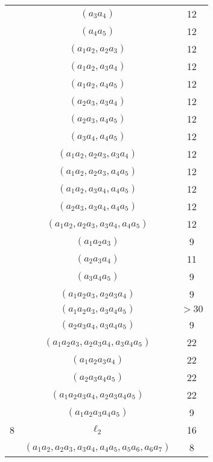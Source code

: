 \documentclass{article}
\begin{document}
\begin{flushleft}
\begin{multicols*}{2}
\begin{center}
\begin{tabular}{|c|c|c|}
            & $(a_3a_4)$ & 12 \\
            & $(a_4a_5)$ & 12 \\
            & $(a_1a_2, a_2a_3)$ & 12 \\
            & $(a_1a_2, a_3a_4)$ & 12 \\
            & $(a_1a_2, a_4a_5)$ & 12 \\
            & $(a_2a_3, a_3a_4)$ & 12 \\
            & $(a_2a_3, a_4a_5)$ & 12 \\
            & $(a_3a_4, a_4a_5)$ & 12 \\
            & $(a_1a_2, a_2a_3, a_3a_4)$ & 12 \\
            & $(a_1a_2, a_2a_3, a_4a_5)$ & 12 \\
            & $(a_1a_2, a_3a_4, a_4a_5)$ & 12 \\
            & $(a_2a_3, a_3a_4, a_4a_5)$ & 12 \\
            & $(a_1a_2, a_2a_3, a_3a_4, a_4a_5)$ & 12 \\
            \rowcolor{red!30!white}
            & $(a_1a_2a_3)$ & 9 \\
            \rowcolor{red!30!white}
            & $(a_2a_3a_4)$ & 11 \\
            \rowcolor{red!30!white}
            & $(a_3a_4a_5)$ & 9 \\
            \rowcolor{red!30!white}
            & $(a_1a_2a_3, a_2a_3a_4)$ & 9 \\
            \rowcolor{red!30!white}
            & $(a_1a_2a_3, a_3a_4a_5)$ & $>30$ \\
            \rowcolor{red!30!white}
            & $(a_2a_3a_4, a_3a_4a_5)$ & 9 \\
            \rowcolor{red!30!white}
            & $(a_1a_2a_3, a_2a_3a_4, a_3a_4a_5)$ & 22 \\
            \rowcolor{red!30!white}
            & $(a_1a_2a_3a_4)$ & 22 \\
            \rowcolor{red!30!white}
            & $(a_2a_3a_4a_5)$ & 22 \\
            \rowcolor{red!30!white}
            & $(a_1a_2a_3a_4, a_2a_3a_4a_5)$ & 22 \\
            \rowcolor{red!30!white}
            & $(a_1a_2a_3a_4a_5)$ & 9 \\
            \hline
            \rowcolor{red!30!white}
            8 & $\ell_2$ & 16 \\
            \rowcolor{red!30!white}
              & $(a_1a_2, a_2a_3, a_3a_4, a_4a_5, a_5a_6, a_6a_7)$ & 8 \\

         \end{tabular}
      \end{center}
   \end{multicols*}
\end{flushleft}
\end{document}

